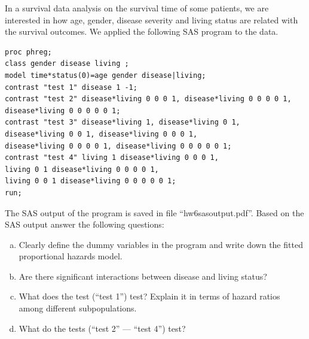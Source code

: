 \documentclass{elegantbook}
\begin{document}
\begin{exercise*}[2]
    In a survival data analysis on the survival time of some patients, we are interested in how age, gender, disease severity and living status are related with the survival outcomes. We applied the following SAS program to the data.
    \begin{verbatim}
proc phreg;
class gender disease living ;
model time*status(0)=age gender disease|living;
contrast "test 1" disease 1 -1;
contrast "test 2" disease*living 0 0 0 1, disease*living 0 0 0 0 1,
disease*living 0 0 0 0 0 1;
contrast "test 3" disease*living 1, disease*living 0 1,
disease*living 0 0 1, disease*living 0 0 0 1,
disease*living 0 0 0 0 1, disease*living 0 0 0 0 0 1;
contrast "test 4" living 1 disease*living 0 0 0 1,
living 0 1 disease*living 0 0 0 0 1,
living 0 0 1 disease*living 0 0 0 0 0 1;
run;
    \end{verbatim}
    The SAS output of the program is saved in file “hw6sasoutput.pdf”. Based on the SAS output answer the following questions:

    \begin{enumerate}[a)]
        \item Clearly define the dummy variables in the program and write down the fitted proportional hazards model. 
        \item Are there significant interactions between disease and living status? 
        \item What does the test (“test 1”) test? Explain it in terms of hazard ratios among different subpopulations. 
        \item What do the tests (“test 2” --- “test 4”) test? 
    \end{enumerate}
\end{exercise*}
\end{document}
